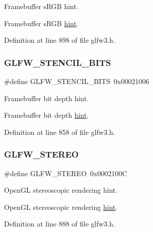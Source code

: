 Framebuffer s\+R\+GB hint. 

Framebuffer s\+R\+GB \mbox{\hyperlink{group__window_ga444a8f00414a63220591f9fdb7b5642b}{hint}}. 

Definition at line 898 of file glfw3.\+h.

\mbox{\label{group__window_ga5339890a45a1fb38e93cb9fcc5fd069d}} 
\subsubsection{\texorpdfstring{GLFW\_STENCIL\_BITS}{GLFW\_STENCIL\_BITS}}
{\footnotesize\ttfamily \#define G\+L\+F\+W\+\_\+\+S\+T\+E\+N\+C\+I\+L\+\_\+\+B\+I\+TS~0x00021006}



Framebuffer bit depth hint. 

Framebuffer bit depth \mbox{\hyperlink{group__window_ga5339890a45a1fb38e93cb9fcc5fd069d}{hint}}. 

Definition at line 858 of file glfw3.\+h.

\mbox{\label{group__window_ga83d991efca02537e2d69969135b77b03}} 
\subsubsection{\texorpdfstring{GLFW\_STEREO}{GLFW\_STEREO}}
{\footnotesize\ttfamily \#define G\+L\+F\+W\+\_\+\+S\+T\+E\+R\+EO~0x0002100C}



Open\+GL stereoscopic rendering hint. 

Open\+GL stereoscopic rendering \mbox{\hyperlink{group__window_ga83d991efca02537e2d69969135b77b03}{hint}}. 

Definition at line 888 of file glfw3.\+h.

\mbox{\label{group__window_ga60a0578c3b9449027d683a9c6abb9f14}} 
